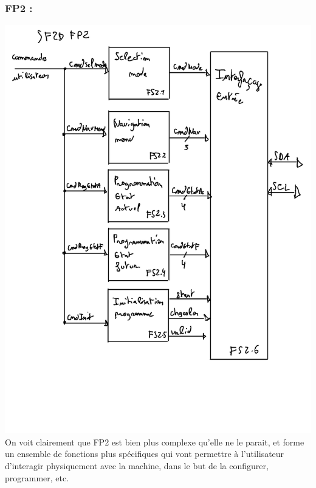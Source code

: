 \documentclass[12pt]{report}
\begin{document}
	\subsubsection{FP2 :}
	\includegraphics[width=\textwidth]{img/SF2DFP2}
	On voit clairement que FP2 est bien plus complexe qu'elle ne le parait, et forme un ensemble de fonctions plus spécifiques qui vont permettre à l'utilisateur d'interagir physiquement avec la machine, dans le but de la configurer, programmer, etc.
\end{document}
